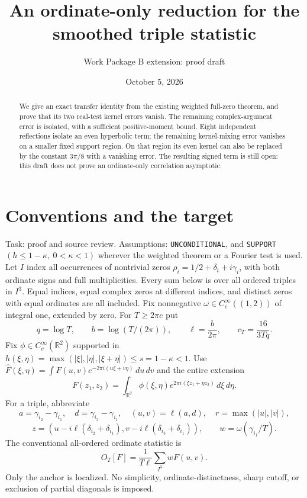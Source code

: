 \documentclass[11pt]{article}
\title{An ordinate-only reduction for the smoothed triple statistic}
\author{Work Package B extension: proof draft}
\date{October 5, 2026}
\newcommand{\R}{\mathbb R}
\newcommand{\dd}{\,d}
\begin{document}
\maketitle
\begin{abstract}
We give an exact transfer identity from the existing weighted full-zero
theorem, and prove that its two real-test kernel errors vanish.
The remaining complex-argument error is isolated, with a sufficient
positive-moment bound. Eight independent reflections isolate an even
hyperbolic term; the remaining kernel-mixing error vanishes on a smaller
fixed support region. On that region its even kernel can also be replaced
by the constant $3\pi/8$ with a vanishing error. The resulting signed term
is still open: this draft does not prove
an ordinate-only correlation asymptotic.
\end{abstract}

\section{Conventions and the target}
Task: proof and source review. Assumptions: \texttt{UNCONDITIONAL}, and
\texttt{SUPPORT}\,$(h\leq1-\kappa,\ 0<\kappa<1)$ wherever the weighted
theorem or a Fourier test is used. Let $I$ index all occurrences of
nontrivial zeros $\rho_i=1/2+\delta_i+i\gamma_i$, with both ordinate
signs and full multiplicities. Every sum below is over all ordered
triples in $I^3$. Equal indices, equal complex zeros at different indices,
and distinct zeros with equal ordinates are all included.
Fix nonnegative $\omega\in C_c^\infty((1,2))$ of integral one, extended
by zero. For $T\geq2\pi e$ put
\[
 q=\log T,\qquad b=\log(T/(2\pi)),\qquad \ell=\frac b{2\pi},
 \qquad c_T=\frac{16}{3Tq}.
\]
Fix $\phi\in C_c^\infty(\R^2)$ supported in
$h(\xi,\eta)=\max(|\xi|,|\eta|,|\xi+\eta|)\leq s=1-\kappa<1$.
Use $\widehat F(\xi,\eta)=\int F(u,v)e^{-2\pi i(u\xi+v\eta)}\dd u\dd v$
and the entire extension
\[
 F(z_1,z_2)=\int_{\R^2}\phi(\xi,\eta)
              e^{2\pi i(\xi z_1+\eta z_2)}\dd\xi\dd\eta.
\]
For a triple, abbreviate
\[
 a=\gamma_{i_2}-\gamma_{i_1},\quad d=\gamma_{i_3}-\gamma_{i_1},\quad
 (u,v)=\ell(a,d),\quad r=\max(|u|,|v|),
\]
\[
 z=(u-i\ell(\delta_{i_2}+\delta_{i_1}),
       v-i\ell(\delta_{i_3}+\delta_{i_1})),\qquad
 w=\omega(\gamma_{i_1}/T).
\]
The conventional all-ordered ordinate statistic is
\begin{equation}\label{eq:ordinate}
 O_T[F]=\frac1{T\ell}\sum_{I^3}wF(u,v).
\end{equation}
Only the anchor is localized. No simplicity, ordinate-distinctness,
sharp cutoff, or exclusion of partial diagonals is imposed.
\end{document}

